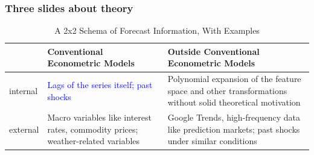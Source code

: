 \documentclass[9pt]{beamer}
\theoremstyle{definition}
\begin{document}
\begin{frame}\frametitle{Three slides about theory}
   
    \begin{table}[htb]
        \centering %
        \caption{A 2x2 Schema of Forecast Information, With Examples}
        \begin{tabular}{ | p{1cm} | p{4.8cm}| p{4.8cm} | } 
          \hline
          & Conventional Econometric Models & Outside Conventional Econometric Models\\ 
          \hline
          internal & \textcolor{blue}{Lags of the series itself; past shocks}  & Polynomial expansion of the feature space and other transformations without solid theoretical motivation \\
          \hline
          external & Macro variables like interest rates, commodity prices; weather-related variables & Google Trends, high-frequency data like prediction markets; past shocks under similar conditions \\ 
          \hline
        \end{tabular}
      \end{table}
\end{frame}
\end{document}
